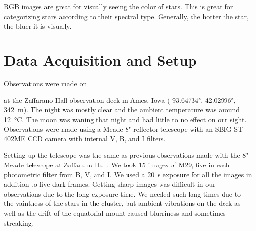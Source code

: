 \documentclass[%
aip,
jmp,
reprint,
floatfix,
nofootinbib
]{revtex4-1}
\begin{document}
	RGB images are great for visually seeing the color of stars. This is great for categorizing stars according to their spectral type. Generally, the hotter the star, the bluer it is visually.
	


	\section{Data Acquisition and Setup}
	Observations were made on \date{06 September 2017} at the Zaffarano Hall observation deck in Ames, Iowa (\ang{-93.64734}, \ang{42.02996}, \SI{342}{\meter}). The night was mostly clear and the ambient temperature was around \SI{12}{\degreeCelsius}. The moon was waning that night and had little to no effect on our sight. Observations were made using a Meade 8" reflector telescope with an SBIG ST-402ME CCD camera with internal V, B, and I filters. 
	
	Setting up the telescope was the same as previous observations made with the 8" Meade telescope at Zaffarano Hall. We took \num{15} images of M29, five in each photometric filter from B, V, and I. We used a \SI{20}{\second} exposure for all the images in addition to five dark frames. Getting sharp images was difficult in our observations due to the long exposure time. We needed such long times due to the vaintness of the stars in the cluster, but ambient vibrations on the deck as well as the drift of the equatorial mount caused blurriness and sometimes streaking.

\end{document}
